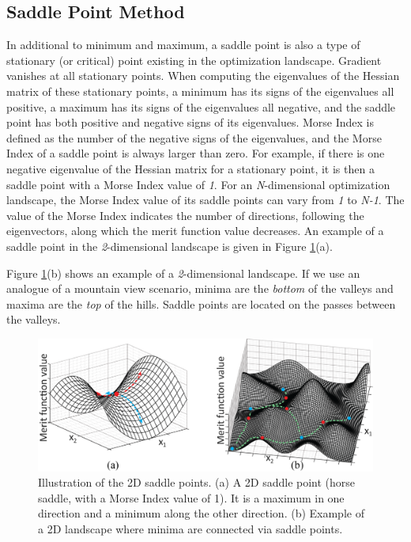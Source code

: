 \subsection{Saddle Point Method} \label{Explaination_critical_points}
In additional to minimum and maximum, a saddle point is also a type of stationary (or critical) point existing in the optimization landscape. Gradient vanishes at all stationary points. When computing the eigenvalues of the Hessian matrix of these stationary points, a minimum has its signs of the eigenvalues all positive, a maximum has its signs of the eigenvalues all negative, and the saddle point has both positive and negative signs of its eigenvalues. Morse Index is defined as the number of the negative signs of the eigenvalues, and the Morse Index of a saddle point is always larger than zero. For example, if there is one negative eigenvalue of the Hessian matrix for a stationary point, it is then a saddle point with a Morse Index value of \textit{1}. For an \textit{N}-dimensional optimization landscape, the Morse Index value of its saddle points can vary from \textit{1} to \textit{N-1}.  The value of the Morse Index indicates the number of directions, following the eigenvectors, along which the merit function value decreases. An example of a saddle point in the \textit{2}-dimensional landscape is given in Figure \ref{fig: saddle_illustration}(a). 

Figure \ref{fig: saddle_illustration}(b) shows an example of a \textit{2}-dimensional landscape. If we use an analogue of a mountain view scenario, minima are the \textit{bottom} of the valleys and maxima are the \textit{top} of the hills. Saddle points are located on the passes between the valleys. 

\begin{figure}[h]
    \centering
    \includegraphics[scale=0.58]{chapter-1/figures/saddle_point_plotted.png}
    \caption{Illustration of the 2D saddle points. (a) A 2D saddle point (horse saddle, with a Morse Index value of 1). It is a maximum in one direction and a minimum along the other direction. (b) Example of a 2D landscape where minima are connected via saddle points. }
    \label{fig: saddle_illustration}
\end{figure} 

